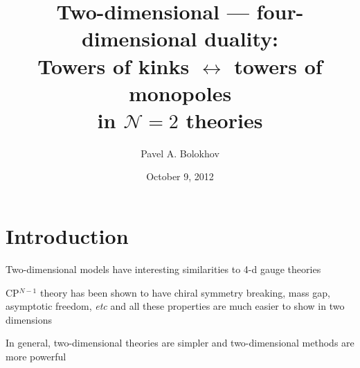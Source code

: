 \documentclass{beamer}
\title[Two-dim. --- four-dim. duality]
      {Two-dimensional --- four-dimensional duality:\\
	Towers of kinks $\leftrightarrow$ towers of monopoles\\ 
		in $\mathcal{N}=2$ theories}
\author{Pavel A. Bolokhov}
\date{October 9, 2012}
\institute[UMN \& SPbSU]{University of Minnesota ~~$\cdot$~~ St.Petersburg State University}
\begin{document}
\maketitle

\section{Introduction}


\begin{frame}{}


	Two-dimensional models have interesting similarities to 4-d gauge theories
\vspace{0.4cm}

	CP$^{N-1}$ theory has been shown to have chiral symmetry breaking, mass gap,
	asymptotic freedom, {\it etc} and all these properties are much easier to show
	in two dimensions 
\vspace{0.4cm}

	In general, two-dimensional theories are simpler and two-dimensional methods
	are more powerful

\end{frame}
\end{document}
